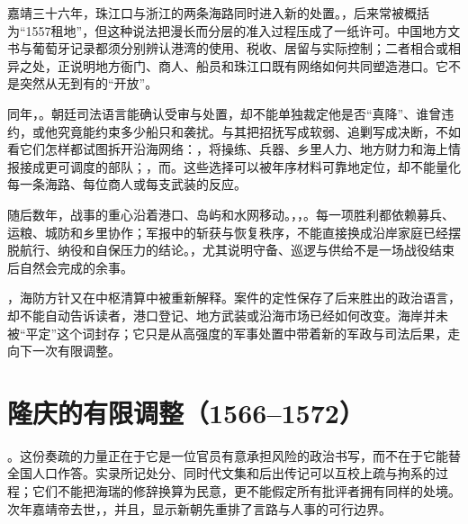 嘉靖三十六年，珠江口与浙江的两条海路同时进入新的处置。，后来常被概括为“1557租地”，但这种说法把漫长而分层的准入过程压成了一纸许可。中国地方文书与葡萄牙记录都须分别辨认港湾的使用、税收、居留与实际控制；二者相合或相异之处，正说明地方衙门、商人、船员和珠江口既有网络如何共同塑造港口。它不是突然从无到有的“开放”。

同年，。朝廷司法语言能确认受审与处置，却不能单独裁定他是否“真降”、谁曾违约，或他究竟能约束多少船只和袭扰。与其把招抚写成软弱、追剿写成决断，不如看它们怎样都试图拆开沿海网络：，将操练、兵器、乡里人力、地方财力和海上情报接成更可调度的部队；，而。这些选择可以被年序材料可靠地定位，却不能量化每一条海路、每位商人或每支武装的反应。

随后数年，战事的重心沿着港口、岛屿和水网移动。，，。每一项胜利都依赖募兵、运粮、城防和乡里协作；军报中的斩获与恢复秩序，不能直接换成沿岸家庭已经摆脱航行、纳役和自保压力的结论。，尤其说明守备、巡逻与供给不是一场战役结束后自然会完成的余事。

，海防方针又在中枢清算中被重新解释。案件的定性保存了后来胜出的政治语言，却不能自动告诉读者，港口登记、地方武装或沿海市场已经如何改变。海岸并未被“平定”这个词封存；它只是从高强度的军事处置中带着新的军政与司法后果，走向下一次有限调整。

\section{隆庆的有限调整（1566--1572）}

。这份奏疏的力量正在于它是一位官员有意承担风险的政治书写，而不在于它能替全国人口作答。实录所记处分、同时代文集和后出传记可以互校上疏与拘系的过程；它们不能把海瑞的修辞换算为民意，更不能假定所有批评者拥有同样的处境。次年嘉靖帝去世，，并且，显示新朝先重排了言路与人事的可行边界。

